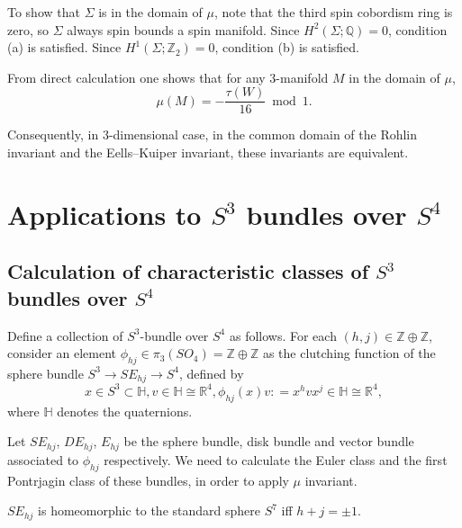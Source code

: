 \documentclass[twoside]{article}
\begin{document}
To show that $\Sigma$ is in the domain of $\mu$, note that the third spin cobordism ring is zero, so $\Sigma$ always spin bounds a spin manifold. Since $H^2(\Sigma;\mathbb{Q}) = 0$, condition (a) is satisfied. Since $H^1(\Sigma;\mathbb{Z}_2) = 0$, condition (b) is satisfied. 

From direct calculation one shows that for any $3$-manifold $M$ in the domain of $\mu$, 
\[
\mu(M) = -\frac{\tau(W)}{16} \bmod 1. 
\]

Consequently, in $3$-dimensional case, in the common domain of the Rohlin invariant and the Eells--Kuiper invariant, these invariants are equivalent. 














\section{Applications to \texorpdfstring{$S^3$}{S3} bundles over \texorpdfstring{$S^4$}{S4}}

\subsection{Calculation of characteristic classes of \texorpdfstring{$S^3$}{S3} bundles over \texorpdfstring{$S^4$}{S4}}

Define a collection of $S^3$-bundle over $S^4$ as follows. For each $(h,j) \in   \mathbb{Z} \oplus \mathbb{Z}$, consider an element $\phi_{hj} \in   \pi_3(SO_4) = \mathbb{Z} \oplus \mathbb{Z}$ as the clutching function of the sphere bundle $S^3\to SE_{hj} \to  S^4$, defined by 
\[
x\in S^3\subset \mathbb{H}, v\in\mathbb{H} \cong \mathbb{R}^4, \phi_{hj}(x)v \colon  = x^hvx^j\in\mathbb{H} \cong \mathbb{R}^4,  
\]
where $\mathbb{H}$ denotes the quaternions. 

Let $SE_{hj}$,  $DE_{hj}$, $E_{hj}$ be the sphere bundle, disk bundle and vector bundle associated to $\phi_{hj}$ respectively. We need to calculate the Euler class and the first Pontrjagin class of these bundles, in order to apply $\mu$ invariant. 

\begin{thm}
	$SE_{hj}$ is homeomorphic to the standard sphere $S^7$ iff $h + j = \pm 1$. 
\end{thm}
\end{document}
